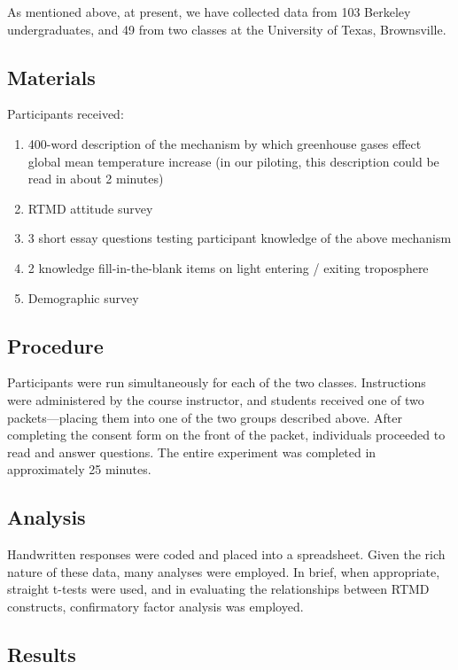 As mentioned above, at present, we have collected data from 103 Berkeley
undergraduates, and 49 from two classes at the University of Texas,
Brownsville.

\subsection{Materials}

Participants received:

\begin{enumerate}
    \item 400-word description of the mechanism 
        by which greenhouse gases effect global mean temperature increase (in our
        piloting, this description could be read in about 2 minutes)
    \item RTMD attitude survey
    \item 3 short essay questions testing participant knowledge of the above mechanism
    \item 2 knowledge fill-in-the-blank items on light entering / exiting troposphere
    \item Demographic survey
\end{enumerate}

\subsection{Procedure}

Participants were run simultaneously for each of the two classes. Instructions
were administered by the course instructor, and students received one of two
packets---placing them into one of the two groups described above. After
completing the consent form on the front of the packet, individuals proceeded to
read and answer questions. The entire experiment was completed in approximately
25 minutes.

\subsection{Analysis}

Handwritten responses were coded and placed into a spreadsheet. Given the rich
nature of these data, many analyses were employed. In brief, when appropriate,
straight t-tests were used, and in evaluating the relationships between RTMD
constructs, confirmatory factor analysis was employed.

\subsection{Results}

